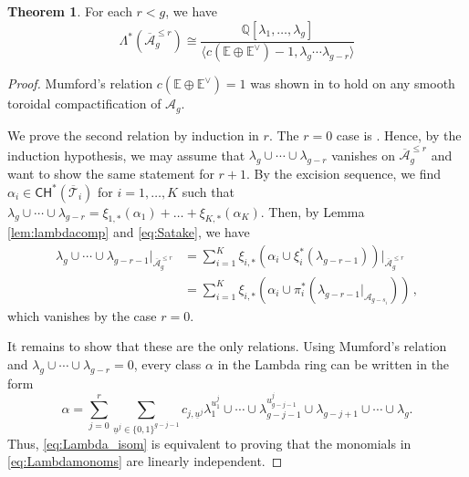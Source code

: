 \documentclass[11pt]{article}
\def\CH{\mathsf{CH}}
\def\QQ{\mathbb{Q}}
\def\Abar{\overline{\mathcal{A}}}
\theoremstyle{definition}
\newtheorem{theorem}[definition]{Theorem}
\begin{document}
\begin{theorem}\label{thm:lambdarels}
    For each $r<g$, we have
    \begin{equation}\label{eq:Lambda_isom}
    \Lambda^*(\overline{\mathcal A}_g^{\leq r}) \cong \frac{\QQ[\lambda_1, \ldots , \lambda_g]}{\langle c(\mathbb E \oplus \mathbb E^\vee)-1, \lambda_g\cdots\lambda_{g-r}\rangle}
    \end{equation}
\end{theorem}
\begin{proof}
    Mumford's relation $c(\mathbb E \oplus \mathbb E^\vee)=1$ was shown in \cite{EV04} to hold on any smooth toroidal compactification of $\mathcal A_g$.
    
	We prove the second relation by induction in $r$. The $r=0$ case is \cite[Proposition 1.2]{vdG99}. Hence, by the induction hypothesis, we may assume that $\lambda_g\cup\cdots \cup \lambda_{g-r}$ vanishes on $\Abar_{g}^{\le r}$ and want to show the same statement for $r+1$. By the excision sequence, we find
	$\alpha_i \in \CH^*(\overline{\mathcal T}_i)$ for $i=1, \ldots ,K$ such that $\lambda_g\cup\cdots \cup \lambda_{g-r} = \xi_{1,\ast}(\alpha_1)+\ldots +\xi_{K,\ast}(\alpha_K)$. Then, by Lemma \ref{lem:lambdacomp} and \eqref{eq:Satake}, we have
    \begin{align*}
    \lambda_g\cup \cdots \cup \lambda_{g-r-1}\big|_{\Abar_g^{\leq r}} &= \sum_{i=1}^K \xi_{i,*}(\alpha_i\cup \xi_i^*(\lambda_{g-r-1}))\big|_{\Abar_g^{\leq r}} \\
    &= \sum_{i=1}^K \xi_{i,*}\left(\alpha_i \cup \pi_i^*\left(\lambda_{g-r-1}\big|_{\mathcal A_{g-s_i}}\right)\right)\,,
    \end{align*}
    which vanishes by the case $r=0$.

    It remains to show that these are the only relations. Using Mumford's relation and $\lambda_g \cup \cdots\cup  \lambda_{g-r}=0$, every class $\alpha$ in the Lambda ring can be written in the form
    \begin{equation}\label{eq:Lambdamonoms}
        \alpha =\sum_{j=0}^r\sum_{\underline{u}^j \in \{0,1\}^{g-j-1}}c_{j, \underline{u}^j}\lambda_{1}^{u^j_1}\cup  \cdots\cup  \lambda_{g-j-1}^{u^j_{g-j-1}}\cup \lambda_{g-j+1}\cup\cdots\cup \lambda_g.
    \end{equation}
    Thus, \eqref{eq:Lambda_isom} is equivalent to proving that the monomials in \eqref{eq:Lambdamonoms} are linearly independent.
    

\end{proof}
\end{document}
